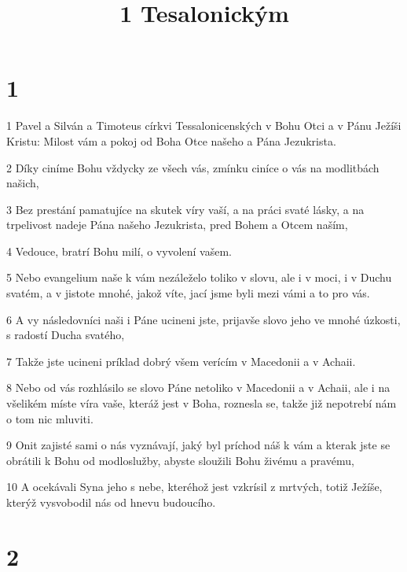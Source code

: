 

\title{1 Tesalonickým}

\chapter{1}

\par 1 Pavel a Silván a Timoteus církvi Tessalonicenských v Bohu Otci a v Pánu Ježíši Kristu: Milost vám a pokoj od Boha Otce našeho a Pána Jezukrista.
\par 2 Díky ciníme Bohu vždycky ze všech vás, zmínku ciníce o vás na modlitbách našich,
\par 3 Bez prestání pamatujíce na skutek víry vaší, a na práci svaté lásky, a na trpelivost nadeje Pána našeho Jezukrista, pred Bohem a Otcem naším,
\par 4 Vedouce, bratrí Bohu milí, o vyvolení vašem.
\par 5 Nebo evangelium naše k vám nezáleželo toliko v slovu, ale i v moci, i v Duchu svatém, a v jistote mnohé, jakož víte, jací jsme byli mezi vámi a to pro vás.
\par 6 A vy následovníci naši i Páne ucineni jste, prijavše slovo jeho ve mnohé úzkosti, s radostí Ducha svatého,
\par 7 Takže jste ucineni príklad dobrý všem verícím v Macedonii a v Achaii.
\par 8 Nebo od vás rozhlásilo se slovo Páne netoliko v Macedonii a v Achaii, ale i na všelikém míste víra vaše, kteráž jest v Boha, roznesla se, takže již nepotrebí nám o tom nic mluviti.
\par 9 Onit zajisté sami o nás vyznávají, jaký byl príchod náš k vám a kterak jste se obrátili k Bohu od modloslužby, abyste sloužili Bohu živému a pravému,
\par 10 A ocekávali Syna jeho s nebe, kteréhož jest vzkrísil z mrtvých, totiž Ježíše, kterýž vysvobodil nás od hnevu budoucího.

\chapter{2}


